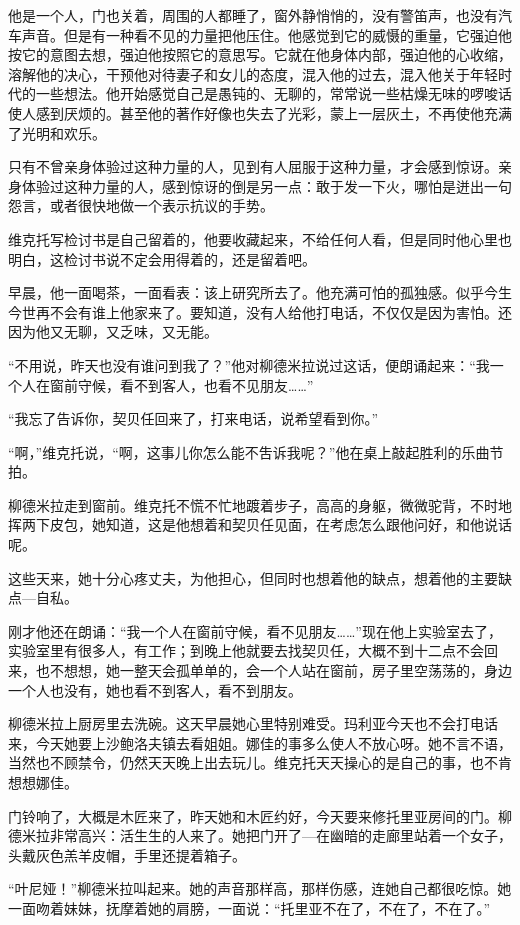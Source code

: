 他是一个人，门也关着，周围的人都睡了，窗外静悄悄的，没有警笛声，也没有汽车声音。但是有一种看不见的力量把他压住。他感觉到它的威慑的重量，它强迫他按它的意图去想，强迫他按照它的意思写。它就在他身体内部，强迫他的心收缩，溶解他的决心，干预他对待妻子和女儿的态度，混入他的过去，混入他关于年轻时代的一些想法。他开始感觉自己是愚钝的、无聊的，常常说一些枯燥无味的啰唆话使人感到厌烦的。甚至他的著作好像也失去了光彩，蒙上一层灰土，不再使他充满了光明和欢乐。

只有不曾亲身体验过这种力量的人，见到有人屈服于这种力量，才会感到惊讶。亲身体验过这种力量的人，感到惊讶的倒是另一点：敢于发一下火，哪怕是迸出一句怨言，或者很快地做一个表示抗议的手势。

维克托写检讨书是自己留着的，他要收藏起来，不给任何人看，但是同时他心里也明白，这检讨书说不定会用得着的，还是留着吧。

早晨，他一面喝茶，一面看表：该上研究所去了。他充满可怕的孤独感。似乎今生今世再不会有谁上他家来了。要知道，没有人给他打电话，不仅仅是因为害怕。还因为他又无聊，又乏味，又无能。

“不用说，昨天也没有谁问到我了？”他对柳德米拉说过这话，便朗诵起来：“我一个人在窗前守候，看不到客人，也看不见朋友……”

“我忘了告诉你，契贝任回来了，打来电话，说希望看到你。”

“啊，”维克托说，“啊，这事儿你怎么能不吿诉我呢？”他在桌上敲起胜利的乐曲节拍。

柳德米拉走到窗前。维克托不慌不忙地踱着步子，高高的身躯，微微驼背，不时地挥两下皮包，她知道，这是他想着和契贝任见面，在考虑怎么跟他问好，和他说话呢。

这些天来，她十分心疼丈夫，为他担心，但同时也想着他的缺点，想着他的主要缺点—自私。

刚才他还在朗诵：“我一个人在窗前守候，看不见朋友……”现在他上实验室去了，实验室里有很多人，有工作；到晚上他就要去找契贝任，大概不到十二点不会回来，也不想想，她一整天会孤单单的，会一个人站在窗前，房子里空荡荡的，身边一个人也没有，她也看不到客人，看不到朋友。

柳德米拉上厨房里去洗碗。这天早晨她心里特别难受。玛利亚今天也不会打电话来，今天她要上沙鲍洛夫镇去看姐姐。娜佳的事多么使人不放心呀。她不言不语，当然也不顾禁令，仍然天天晚上出去玩儿。维克托天天操心的是自己的事，也不肯想想娜佳。

门铃响了，大概是木匠来了，昨天她和木匠约好，今天要来修托里亚房间的门。柳德米拉非常高兴：活生生的人来了。她把门开了—在幽暗的走廊里站着一个女子，头戴灰色羔羊皮帽，手里还提着箱子。

“叶尼娅！”柳德米拉叫起来。她的声音那样高，那样伤感，连她自己都很吃惊。她一面吻着妹妹，抚摩着她的肩膀，一面说：“托里亚不在了，不在了，不在了。”

